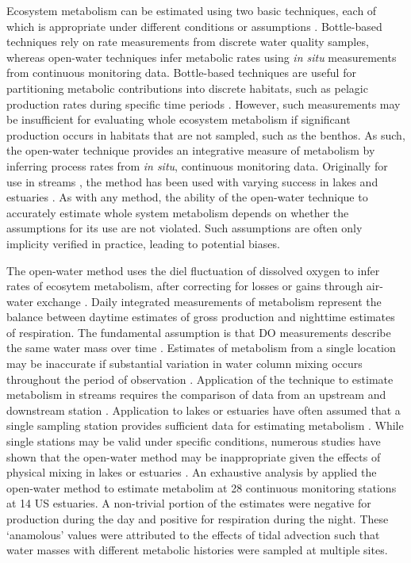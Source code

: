 \documentclass[letterpaper,12pt,oneside]{article}\usepackage[]{graphicx}\usepackage[]{color}
\begin{document}
Ecosystem metabolism can be estimated using two basic techniques, each of which is appropriate under different conditions or assumptions \citep{Kemp12}.   Bottle-based techniques rely on rate measurements from discrete water quality samples, whereas open-water techniques infer metabolic rates using \textit{in situ} measurements from continuous monitoring data.  Bottle-based techniques are useful for partitioning metabolic contributions into discrete habitats, such as pelagic production rates during specific time periods \citep{Kemp12}.  However, such measurements may be insufficient for evaluating whole ecosystem metabolism if significant production occurs in habitats that are not sampled, such as the benthos.  As such, the open-water technique provides an integrative measure of metabolism by inferring process rates from \textit{in situ}, continuous monitoring data.  Originally for use in streams \citep{Odum56}, the method has been used with varying success in lakes \citep{Staehr10,Coloso11,Batt12} and estuaries \citep{Caffrey04,Hopkinson05,Caffrey13}.  As with any method, the ability of the open-water technique to accurately estimate whole system metabolism depends on whether the assumptions for its use are not violated.  Such assumptions are often only implicity verified in practice, leading to potential biases.

The open-water method uses the diel fluctuation of dissolved oxygen to infer rates of ecosytem metabolism, after correcting for losses or gains through air-water exchange \citep{Kemp12}.  Daily integrated measurements of metabolism represent the balance between daytime estimates of gross production and nighttime estimates of respiration.  The fundamental assumption is that \ac{DO} measurements describe the same water mass over time \citep{Needoba12}.  Estimates of metabolism from a single location may be inaccurate if substantial variation in water column mixing occurs throughout the period of observation \citep{Russell07}.  Application of the technique to estimate metabolism in streams requires the comparison of data from an upstream and downstream station \citep{Odum56}.  Application to lakes or estuaries have often assumed that a single sampling station provides sufficient data for estimating metabolism \cite{Staehr10}.  While single stations may be valid under specific conditions, numerous studies have shown that the open-water method may be inappropriate given the effects of physical mixing in lakes or estuaries \citep{Ziegler98,Caffrey03,Coloso11,Batt12,Nidzieko14}.  An exhaustive analysis by \citet{Caffrey03} applied the open-water method to estimate metabolim at 28 continuous monitoring stations at 14 US estuaries.  A non-trivial portion of the estimates were negative for production during the day and positive for respiration during the night.  These `anamolous' values were attributed to the effects of tidal advection such that water masses with different metabolic histories were sampled at multiple sites. 
\end{document}
